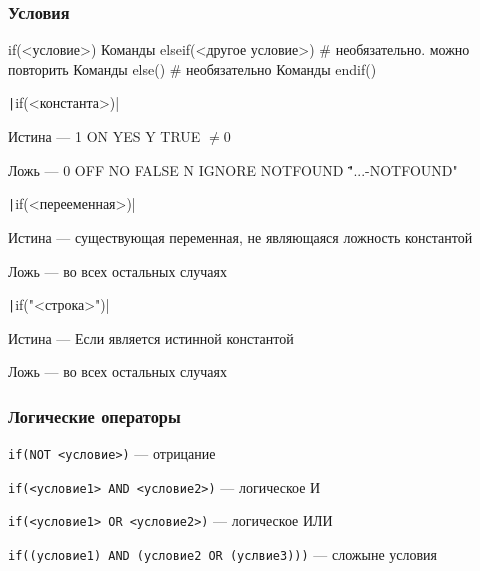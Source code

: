 \documentclass[10pt, aspectratio=1610]{beamer}
\begin{document}
\begin{frame}[fragile]\frametitle{Условия}
	
	\begin{cmakecode}
		if(<условие>)
			Команды
		elseif(<другое условие>) # необязательно. можно повторить
			Команды
		else()              # необязательно
			Команды
		endif()
	\end{cmakecode}
	
	\hfill
	
	\texttt|if(<константа>)|
	
	Истина --- 1 ON YES Y TRUE $\neq 0$
	
	Ложь --- 0 OFF NO FALSE N IGNORE NOTFOUND \"\" "...-NOTFOUND"
	
	\hfill
	
	\texttt|if(<перееменная>)|
	
	Истина --- существующая переменная, не являющаяся ложность константой
	
	Ложь --- во всех остальных случаях
	
	\hfill
	
	\texttt|if("<строка>")|
	
	Истина --- Если является истинной константой
	
	Ложь --- во всех остальных случаях
	
\end{frame}


\begin{frame}\frametitle{Логические операторы}
	
	\texttt{if(NOT <условие>)} --- отрицание
	
	\hfill
	
	\texttt{if(<условие1> AND <условие2>)} --- логическое И
	
	\hfill
	
	\texttt{if(<условие1> OR <условие2>)} --- логическое ИЛИ
	
	\hfill
	
	\texttt{if((условие1) AND (условие2 OR (услвие3)))} --- сложыне условия
	
\end{frame}
\end{document}
